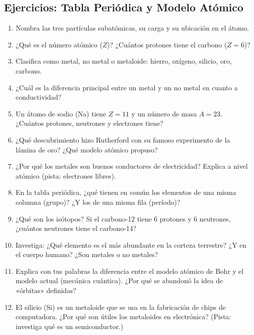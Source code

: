\documentclass[12pt, a4paper]{article}
\begin{document}
\newpage

\subsection{Ejercicios: Tabla Periódica y Modelo Atómico}

\begin{enumerate}[leftmargin=*, resume]
  \item \facil{} Nombra las tres partículas subatómicas, su carga y su ubicación en el átomo.

  \item \facil{} ¿Qué es el número atómico ($Z$)? ¿Cuántos protones tiene el carbono ($Z = 6$)?

  \item \facil{} Clasifica como metal, no metal o metaloide: hierro, oxígeno, silicio, oro, carbono.

  \item \facil{} ¿Cuál es la diferencia principal entre un metal y un no metal en cuanto a conductividad?

  \item \medio{} Un átomo de sodio (Na) tiene $Z = 11$ y un número de masa $A = 23$. ¿Cuántos protones, neutrones y electrones tiene?

  \item \medio{} ¿Qué descubrimiento hizo Rutherford con su famoso experimento de la lámina de oro? ¿Qué modelo atómico propuso?

  \item \medio{} ¿Por qué los metales son buenos conductores de electricidad? Explica a nivel atómico (pista: electrones libres).

  \item \medio{} En la tabla periódica, ¿qué tienen en común los elementos de una misma columna (grupo)? ¿Y los de una misma fila (período)?

  \item \dificil{} ¿Qué son los isótopos? Si el carbono-12 tiene 6 protones y 6 neutrones, ¿cuántos neutrones tiene el carbono-14?

  \item \dificil{} Investiga: ¿Qué elemento es el más abundante en la corteza terrestre? ¿Y en el cuerpo humano? ¿Son metales o no metales?

  \item \dificil{} Explica con tus palabras la diferencia entre el modelo atómico de Bohr y el modelo actual (mecánica cuántica). ¿Por qué se abandonó la idea de «órbitas» definidas?

  \item \dificil{} El silicio (Si) es un metaloide que se usa en la fabricación de chips de computadora. ¿Por qué son útiles los metaloides en electrónica? (Pista: investiga qué es un semiconductor.)
\end{enumerate}
\end{document}
